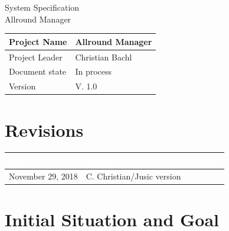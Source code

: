 \documentclass[12pt]{article}
\theoremstyle{definition}
\newcommand{\projectname}{Allround Manager}
\newcommand{\productname}{Allround Manager}
\newcommand{\projectleader}{Christian Bachl}
\newcommand{\documentstatus}{In process}
\newcommand{\version}{V. 1.0}
\begin{document}
\begin{titlepage}
\begin{flushright}
\end{flushright}

\vspace{10em}

\begin{center}
{\Huge System Specification} \\[3em]
{\LARGE \productname} \\[3em]
\end{center}

\begin{flushleft}
\begin{tabular}{|l|l|}
\hline
Project Name & \projectname \\ \hline
Project Leader & \projectleader \\ \hline
Document state & \documentstatus \\ \hline
Version & \version \\ \hline
\end{tabular}
\end{flushleft}

\end{titlepage}
\section*{Revisions}
\begin{tabular}{|l|l|l|}
\hline
\cellcolor[gray]{0.5}\textcolor{white}{Date} & \cellcolor[gray]{0.5}\textcolor{white}{Author} & \cellcolor[gray]{0.5}\textcolor{white}{Change} \\ \hline
November 29, 2018&C. Christian/Jusic version \\ \hline
\end{tabular}
\pagebreak

\tableofcontents
\pagebreak

\section{Initial Situation and Goal}
\end{document}
